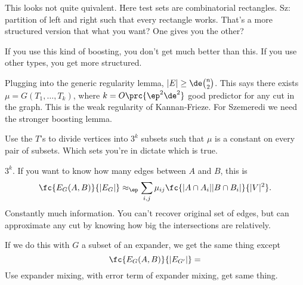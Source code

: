 This looks not quite quivalent. Here test sets are combinatorial rectangles. Sz: partition of left and right such that every rectangle works. That's a more structured version that what you want?
One gives you the other?

If you use this kind of boosting, you don't get much better than this. If you use other types, you get more structured. 

Plugging into the generic regularity lemma, $|E|\ge \de \binom n2$. This says there exists $\mu=G(T_1,\ldots, T_k)$, where $k=O\prc{\ep^2\de^2}$ good predictor for any cut in the graph. This is the weak regularity of Kannan-Frieze. For Szemeredi we need the stronger boosting lemma.

Use the $T$'s to divide vertices into $3^k$ subsets such that $\mu$ is a constant on every pair of subsets. Which sets you're in dictate which is true. 

$3^k$.  If you want to know how many edges between $A$ and $B$, this is 
$$
\fc{E_G(A,B)}{|E_G|}
\approx_\ep \sum_{i,j} 
\mu_{ij}
\fc{|A\cap A_i||B\cap B_i|}{|V|^2}.
$$
Constantly much information. You can't recover original set of edges, but can approximate any cut by knowing how big the  intersections are relatively.

If we do this with $G$ a subset of an expander, we get the same thing except 
$$
\fc{E_G(A,B)}{|E_{G'}|} = 
$$
Use expander mixing, with error term of expander mixing, get same thing.







